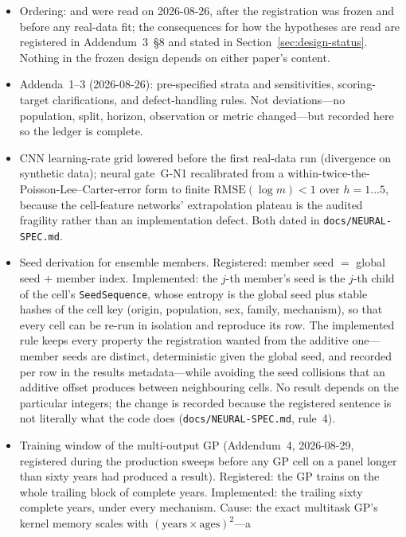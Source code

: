 \begin{itemize}
\item Ordering: \citet{dowd2010backtesting} and \citet{schnurch2022point}
  were read on 2026-08-26, after the registration was frozen and before
  any real-data fit; the consequences for how the hypotheses are read are
  registered in Addendum~3~\S8 and stated in
  Section~\ref{sec:design-status}. Nothing in the frozen design depends on
  either paper's content.
\item Addenda~1--3 (2026-08-26): pre-specified strata and sensitivities,
  scoring-target clarifications, and defect-handling rules. Not
  deviations---no population, split, horizon, observation or metric
  changed---but recorded here so the ledger is complete.
\item CNN learning-rate grid lowered before the first real-data run
  (divergence on synthetic data); neural gate~G-N1 recalibrated from
  a within-twice-the-Poisson-Lee--Carter-error form to finite
  $\mathrm{RMSE}(\log m) < 1$ over $h = 1\ldots5$, because the
  cell-feature networks' extrapolation plateau is the
  audited fragility rather than an implementation defect. Both dated in
  \texttt{docs/NEURAL-SPEC.md}.
\item Seed derivation for ensemble members. Registered: member seed $=$
  global seed $+$ member index. Implemented: the $j$-th member's seed is the
  $j$-th child of the cell's \texttt{SeedSequence}, whose entropy is the
  global seed plus stable hashes of the cell key (origin, population, sex,
  family, mechanism), so that every cell can be re-run in isolation and
  reproduce its row. The implemented rule keeps every property the
  registration wanted from the additive one---member seeds are distinct,
  deterministic given the global seed, and recorded per row in the results
  metadata---while avoiding the seed collisions that an additive offset
  produces between neighbouring cells. No result depends on the particular
  integers; the change is recorded because the registered sentence is not
  literally what the code does (\texttt{docs/NEURAL-SPEC.md}, rule~4).
\item Training window of the multi-output GP (Addendum~4, 2026-08-29,
  registered during the production sweeps before any GP cell on a panel
  longer than sixty years had produced a result). Registered: the GP trains
  on the whole trailing block of complete years. Implemented: the trailing
  sixty complete years, under every mechanism. Cause: the exact multitask
  GP's kernel memory scales with $(\text{years}\times\text{ages})^2$---a

\end{itemize}
